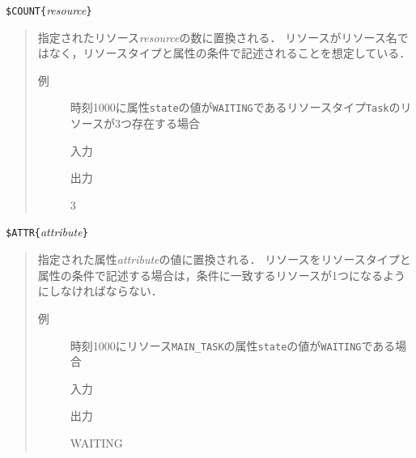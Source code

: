 \verb|$COUNT{|\textit{resource}\verb|}|
\vspace{-1zw}
\begin{quote}
指定されたリソース{\it resource}の数に置換される．
リソースがリソース名ではなく，リソースタイプと属性の条件で記述されることを想定している．

\begin{description}
\item[例] 時刻1000に属性{\tt state}の値が{\tt WAITING}であるリソースタイプ{\tt Task}のリソースが3つ存在する場合

\hspace*{-1zw}入力\vspace{-1.75zw}
\hspace*{-1zw}出力\vspace{-1.75zw}
\begin{EBNF}
3
\end{EBNF}
\end{description}

\end{quote}

\verb|$ATTR{|\textit{attribute}\verb|}|
\vspace{-1zw}
\begin{quote}
指定された属性{\it attribute}の値に置換される．
リソースをリソースタイプと属性の条件で記述する場合は，条件に一致するリソースが1つになるようにしなければならない．

\begin{description}
\item[例] 時刻1000にリソース{\tt MAIN\_TASK}の属性{\tt state}の値が{\tt WAITING}である場合

\hspace*{-1zw}入力\vspace{-1.75zw}
\hspace*{-1zw}出力\vspace{-1.75zw}
\begin{EBNF}
WAITING
\end{EBNF}
\end{description}

\end{quote}

